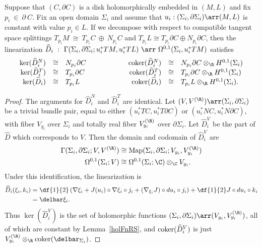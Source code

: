 \begin{lemma} \label{kerOpen}
Suppose that $(C,\partial C)$ is a disk holomorphically embedded in $(M,L)$ and fix $p_i~\in~\partial~C$. Fix an open domain $\Sigma_i$ and assume that $u_i:(\Sigma_i,\partial\Sigma_i) \arr (M,L)$ is constant with value $p_i \in L$. 
If we decompose with respect to compatible tangent space splittings $T_{p_i}M~\cong~T_{p_i}C~\oplus~N_{p_i}C$ and $T_{p_i}L \cong T_{p_i}\partial C \oplus N_{p_i}\partial C$, then the linearization $\hat{D}_i~:~\Gamma(\Sigma_i,\partial\Sigma_i;u_i^*TM,u_i^*TL)~\arr~\Omega^{0,1}(\Sigma_i,u_i^*TM)$ satisfies
\[
\begin{array}{rclcrcl}
\ker(\hat{D}_i^N) & \cong & N_{p_i}\partial C & \qquad\qquad & \coker(\hat{D}_i^N) & \cong & N_{p_i}\partial C \otimes_\R H^{0,1}(\Sigma_i)
\\
\ker(\hat{D}_i^T) & \cong & T_{p_i}\partial C && \coker(\hat{D}_i^T) & \cong & T_{p_i}\partial C \otimes_\R H^{0,1}(\Sigma_i)
\\
\ker(\hat{D}_i) & \cong & T_{p_i}L && \coker(\hat{D}_i) & \cong & T_{p_i}L \otimes_\R H^{0,1}(\Sigma_i).
\end{array}
\]
\begin{proof}
The arguments for $\hat{D}_i^N$ and $\hat{D}_i^T$ are identical. Let $(V,V^{(\R)}) \arr (\Sigma_i,\partial\Sigma_i)$ be a trivial bundle pair, equal to either $(u_i^*TC,u_i^*T\partial C)$ or $(u_i^*NC,u_i^*N\partial C)$, with fiber $V_{y_i}$ over $\Sigma_i$ and totally real fiber $V_{y_i}^{(\R)}$ over $\partial\Sigma_i$. Let $\hat{D}_i^V$ be the part of $\hat{D}$ which corresponds to $V$. Then the domain and codomain of $\hat{D}_i^V$ are
\begin{align*}
\Gamma(\Sigma_i,\partial\Sigma_i; V,V^{(\R)}) & \cong \Map(\Sigma_i,\partial\Sigma_i;V_{y_i},V_{y_i}^{(\R)})
\\
\Omega^{0,1}(\Sigma_i;V) & \cong \Omega^{0,1}(\Sigma_i;\C) \otimes_\C V_{y_i}.
\end{align*}
Under this identification, the linearization is
\begin{align*}
\hat{D}_i(\xi_i,k_i) & = \df{1}{2} \left( \nabla\xi_i + J(u_i) \circ \nabla\xi_i \circ j_i + (\nabla_{\xi_i} J) \circ du_i \circ j_i \right) + \df{1}{2}J \circ du_i \circ k_i
\\
& = \delbar\xi_i.
\end{align*}
Thus $\ker(\hat{D}_i^V)$ is the set of holomorphic functions $(\Sigma_i,\partial\Sigma_i) \arr (V_{y_i},V_{y_i}^{(\R)})$, all of which are constant by Lemma~\ref{holFnRS}, and $\operatorname{coker}(\widehat{D}_i^V)$ is just $V_{y_i}^{(\R)} \otimes_\R \coker(\delbar_{\Sigma_i})$.
\end{proof}
\end{lemma}

